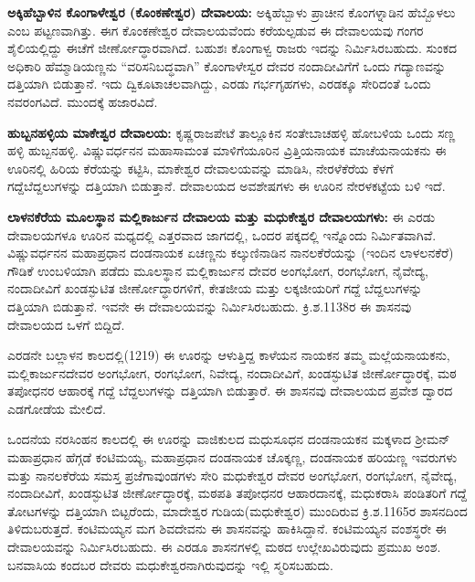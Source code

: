 \textbf{ಅಕ್ಕಿಹೆಬ್ಬಾಳಿನ ಕೊಂಗಾಳೇಶ್ವರ (ಕೊಂಕಣೇಶ್ವರ) ದೇವಾಲಯ:} ಅಕ್ಕಿಹೆಬ್ಬಾಳು ಪ್ರಾಚೀನ ಕೊಂಗಳ್ನಾಡಿನ ಹೆಬ್ಬೊಳಲು ಎಂಬ ಪಟ್ಟಣವಾಗಿತ್ತು. ಈಗ ಕೊಂಕಣೇಶ್ವರ ದೇವಾಲಯವೆಂದು ಕರೆಯಲ್ಪಡುವ ಈ ದೇವಾಲಯವು ಗಂಗರ ಶೈಲಿಯಲ್ಲಿದ್ದು ಈಚೆಗೆ ಜೀರ್ಣೋದ್ಧಾರವಾಗಿದೆ. ಬಹುಶಃ ಕೊಂಗಾಳ್ವ ರಾಜರು ಇದನ್ನು ನಿರ್ಮಿಸಿರಬಹುದು. ಸುಂಕದ ಅಧಿಕಾರಿ ಹೆಮ್ಮಾಡಿಯಣ್ಣನು “ವರಿಸನಿಬದ್ಧವಾಗಿ” ಕೊಂಗಾಳೇಸ್ವರ ದೇವರ ನಂದಾದೀವಿಗೆಗೆ ಒಂದು ಗದ್ಯಾಣವನ್ನು ದತ್ತಿಯಾಗಿ ಬಿಡುತ್ತಾನೆ. ಇದು ದ್ವಿಕೂಟಾಚಲವಾಗಿದ್ದು, ಎರಡು ಗರ್ಭಗೃಹಗಳು, ಎರಡಕ್ಕೂ ಸೇರಿದಂತೆ ಒಂದು ನವರಂಗವಿದೆ. ಮುಂದಕ್ಕೆ ಹಜಾರವಿದೆ. 

\textbf{ಹುಬ್ಬನಹಳ್ಳಿಯ ಮಾಕೇಶ್ವರ ದೇವಾಲಯ:} ಕೃಷ್ಣರಾಜಪೇಟೆ ತಾಲ್ಲೂಕಿನ ಸಂತೇಬಾಚಹಳ್ಳಿ ಹೋಬಳಿಯ ಒಂದು ಸಣ್ಣ ಹಳ್ಳಿ ಹುಬ್ಬನಹಳ್ಳಿ. ವಿಷ್ಣುವರ್ಧನನ ಮಹಾಸಾಮಂತ ಮಾಳಿಗೆಯೂರಿನ ವ್ರಿತ್ತಿಯನಾಯಕ ಮಾಚೆಯನಾಯಕನು ಈ ಊರಿನಲ್ಲಿ ಹಿರಿಯ ಕೆರೆಯನ್ನು ಕಟ್ಟಿಸಿ, ಮಾಕೇಶ್ವರ ದೇವಾಲಯವನ್ನು ಮಾಡಿಸಿ, ನೇರಳೆಕೆರೆಯ ಕೆಳಗೆ ಗದ್ದೆಬೆದ್ದಲುಗಳನ್ನು ದತ್ತಿಯಾಗಿ ಬಿಡುತ್ತಾನೆ. ದೇವಾಲಯದ ಅವಶೇಷಗಳು ಈ ಊರಿನ ನೇರಳಕಟ್ಟೆಯ ಬಳಿ ಇದೆ.

\textbf{ಲಾಳನಕೆರೆಯ ಮೂಲಸ್ಥಾನ ಮಲ್ಲಿಕಾರ್ಜುನ ದೇವಾಲಯ ಮತ್ತು ಮಧುಕೇಶ್ವರ ದೇವಾಲಯಗಳು:} ಈ ಎರಡು ದೇವಾಲಯಗಳೂ ಊರಿನ ಮಧ್ಯದಲ್ಲಿ ಎತ್ತರವಾದ ಜಾಗದಲ್ಲಿ, ಒಂದರ ಪಕ್ಕದಲ್ಲಿ ಇನ್ನೊಂದು ನಿರ್ಮಿತವಾಗಿವೆ.\textbf{ }ವಿಷ್ಣುವರ್ಧನನ ಮಹಾಪ್ರಧಾನ ದಂಡನಾಯಕ ಏಚಣ್ಣನು ಕಲ್ಕುಣಿನಾಡಿನ ನಾನಲಕೆರೆಯನ್ನು (ಇಂದಿನ ಲಾಳಲನಕೆರೆ) ಗೌಡಿಕೆ ಉಂಬಳಿಯಾಗಿ ಪಡೆದು ಮೂಲಸ್ಥಾನ ಮಲ್ಲಿಕಾರ್ಜುನ ದೇವರ ಅಂಗಭೋಗ, ರಂಗಭೋಗ, ನೈವೇದ್ಯ, ನಂದಾದೀವಿಗೆ ಖಂಡಸ್ಫುಟಿತ ಜೀರ್ಣೋದ್ಧಾರಗಳಿಗೆ, ಕೇತಜೀಯ ಮತ್ತು ಲಕ್ಕಜೀಯರಿಗೆ ಗದ್ದೆ ಬೆದ್ದಲುಗಳನ್ನು ದತ್ತಿಯಾಗಿ ಬಿಡುತ್ತಾನೆ. ಇವನೇ ಈ ದೇವಾಲಯವನ್ನು ನಿರ್ಮಿಸಿರಬಹುದು. ಕ್ರಿ.ಶ.1138ರ ಈ ಶಾಸನವು ದೇವಾಲಯದ ಒಳಗೆ ಬಿದ್ದಿದೆ. 

ಎರಡನೇ ಬಲ್ಲಾಳನ ಕಾಲದಲ್ಲಿ(1219) ಈ ಊರನ್ನು ಆಳುತ್ತಿದ್ದ ಕಾಳೆಯನ ನಾಯಕನ ತಮ್ಮ ಮಲ್ಲೆಯನಾಯಕನು, ಮಲ್ಲಿಕಾರ್ಜುನದೇವರ ಅಂಗಭೋಗ, ರಂಗಭೋಗ, ನಿವೇದ್ಯ, ನಂದಾದೀವಿಗೆ, ಖಂಡಸ್ಫುಟಿತ ಜೀರ್ಣೋದ್ಧಾರಕ್ಕೆ, ಮಠ ತಪೋಧನರ ಆಹಾರಕ್ಕೆ ಗದ್ದೆ ಬೆದ್ದಲುಗಳನ್ನು ದತ್ತಿಯಾಗಿ ಬಿಡುತ್ತಾರೆ. ಈ ಶಾಸನವು ದೇವಾಲಯದ ಪ್ರವೇಶ ದ್ವಾರದ ಎಡಗೋಡೆಯ ಮೇಲಿದೆ.

ಒಂದನೆಯ ನರಸಿಂಹನ ಕಾಲದಲ್ಲಿ ಈ ಊರನ್ನು ವಾಜಿಕುಲದ ಮಧುಸೂಧನ ದಂಡನಾಯಕನ ಮಕ್ಕಳಾದ ಶ‍್ರೀಮನ್​ ಮಹಾಪ್ರಧಾನ ಹೆಗ್ಗಡೆ ಕಂಟಿಮಯ್ಯ, ಮಹಾಪ್ರಧಾನ ದಂಡನಾಯಕ ಚೊಕ್ಕಣ್ಣ, ದಂಡನಾಯಕ ಹರಿಯಣ್ಣ ಇವರುಗಳು ಮತ್ತು ನಾನಲಕೆರೆಯ ಸಮಸ್ತ ಪ್ರಜೆಗಾವುಂಡಗಳು ಸೇರಿ ಮಧುಕೇಶ್ವರ ದೇವರ ಅಂಗಭೋಗ, ರಂಗಭೋಗ, ನೈವೇದ್ಯ, ನಂದಾದೀವಿಗೆ, ಖಂಡಸ್ಫುಟಿತ ಜೀರ್ಣೋದ್ಧಾರಕ್ಕೆ, ಮಠಪತಿ ತಪೋಧನರ ಆಹಾರದಾನಕ್ಕೆ, ಮಧುಕರಾಸಿ ಪಂಡಿತರಿಗೆ ಗದ್ದೆ ತೋಟಗಳನ್ನು ದತ್ತಿಯಾಗಿ ಬಿಟ್ಟರೆಂದು, ಮಾದೇಶ್ವರ ಗುಡಿಯ(ಮಧುಕೇಶ್ವರ) ಮುಂದಿರುವ ಕ್ರಿ.ಶ.1165ರ ಶಾಸನದಿಂದ ತಿಳಿದುಬರುತ್ತದೆ. ಕಂಟಿಮಯ್ಯನ ಮಗ ಶಿವದೇವನು ಈ ಶಾಸನವನ್ನು ಹಾಕಿಸಿದ್ದಾನೆ. ಕಂಟಿಮಯ್ಯನ ವಂಶಸ್ಥರೇ ಈ ದೇವಾಲಯವನ್ನು ನಿರ್ಮಿಸಿರಬಹುದು. ಈ ಎರಡೂ ಶಾಸನಗಳಲ್ಲಿ ಮಠದ ಉಲ್ಲೇಖವಿರುವುದು ಪ್ರಮುಖ ಅಂಶ. ಬನವಾಸಿಯ ಕಂದಬರ ದೇವರು ಮಧುಕೇಶ್ವರನಾಗಿರುವುದನ್ನು ಇಲ್ಲಿ ಸ್ಮರಿಸಬಹುದು.

